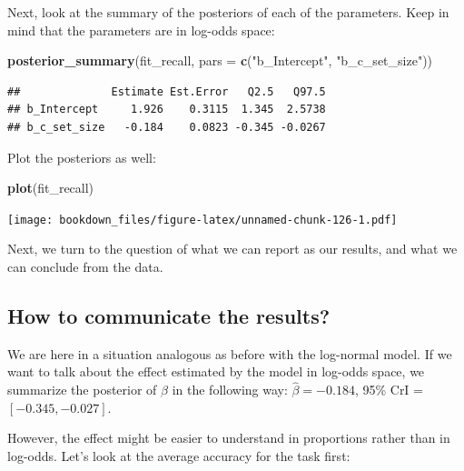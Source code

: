\documentclass[12pt,]{krantz}
\newenvironment{Shaded}{\begin{snugshade}}{\end{snugshade}}
\newcommand{\DataTypeTok}[1]{\textcolor[rgb]{0.13,0.29,0.53}{#1}}
\newcommand{\DecValTok}[1]{\textcolor[rgb]{0.00,0.00,0.81}{#1}}
\newcommand{\KeywordTok}[1]{\textcolor[rgb]{0.13,0.29,0.53}{\textbf{#1}}}
\newcommand{\NormalTok}[1]{#1}
\newcommand{\OperatorTok}[1]{\textcolor[rgb]{0.81,0.36,0.00}{\textbf{#1}}}
\newcommand{\StringTok}[1]{\textcolor[rgb]{0.31,0.60,0.02}{#1}}
\theoremstyle{definition}
\theoremstyle{definition}
\theoremstyle{definition}
\theoremstyle{remark}
\begin{document}
Next, look at the summary of the posteriors of each of the parameters. Keep in mind that the parameters are in log-odds space:

\begin{Shaded}
\begin{Highlighting}[]
\KeywordTok{posterior_summary}\NormalTok{(fit_recall, }\DataTypeTok{pars =} \KeywordTok{c}\NormalTok{(}\StringTok{"b_Intercept"}\NormalTok{, }\StringTok{"b_c_set_size"}\NormalTok{))}
\end{Highlighting}
\end{Shaded}

\begin{verbatim}
##              Estimate Est.Error   Q2.5   Q97.5
## b_Intercept     1.926    0.3115  1.345  2.5738
## b_c_set_size   -0.184    0.0823 -0.345 -0.0267
\end{verbatim}

Plot the posteriors as well:

\begin{Shaded}
\begin{Highlighting}[]
\KeywordTok{plot}\NormalTok{(fit_recall)}
\end{Highlighting}
\end{Shaded}

\texttt{[image: bookdown\_files/figure-latex/unnamed-chunk-126-1.pdf]}

Next, we turn to the question of what we can report as our results, and what we can conclude from the data.

\hypertarget{sec:comlogis}{%
\subsection{How to communicate the results?}\label{sec:comlogis}}

We are here in a situation analogous as before with the log-normal model. If we want to talk about the effect estimated by the model in log-odds space, we summarize the posterior of \(\beta\) in the following way: \(\hat\beta = -0.184\), 95\% CrI = \([ -0.345 , -0.027 ]\).

However, the effect might be easier to understand in proportions rather than in log-odds. Let's look at the average accuracy for the task first:

\begin{Shaded}
\end{Shaded}
\end{document}
